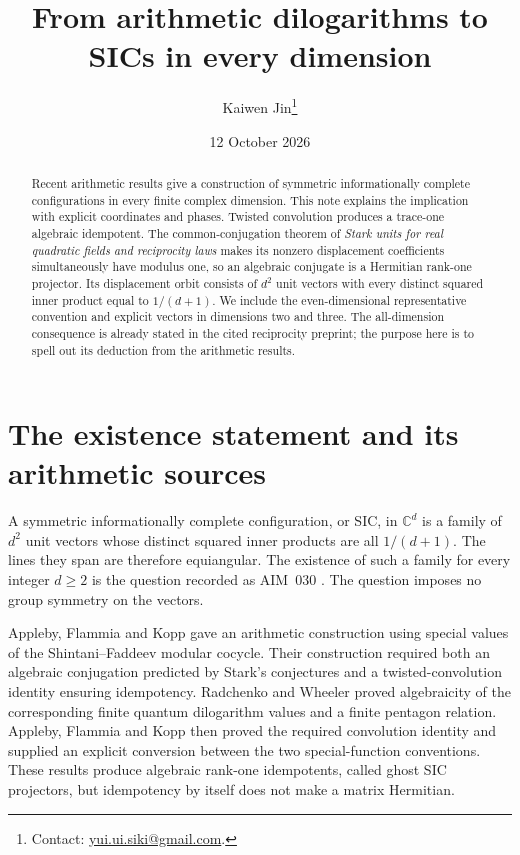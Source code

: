 \documentclass[11pt]{article}
\title{From arithmetic dilogarithms to SICs in every dimension}
\author{Kaiwen Jin\thanks{Contact: \href{mailto:yui.ui.siki@gmail.com}{yui.ui.siki@gmail.com}.}}
\date{12 October 2026}
\newcommand{\C}{\mathbb C}
\begin{document}
\maketitle
\begin{abstract}
Recent arithmetic results give a construction of symmetric informationally
complete configurations in every finite complex dimension. This note explains
the implication with explicit coordinates and phases. Twisted convolution
produces a trace-one algebraic idempotent. The common-conjugation theorem of
\emph{Stark units for real quadratic fields and reciprocity laws} makes its
nonzero displacement coefficients simultaneously have modulus one, so an
algebraic conjugate is a Hermitian rank-one projector. Its displacement orbit
consists of $d^2$ unit vectors with every distinct squared inner product equal
to $1/(d+1)$. We include the even-dimensional representative convention and
explicit vectors in dimensions two and three. The all-dimension consequence
is already stated in the cited reciprocity preprint; the purpose here is to
spell out its deduction from the arithmetic results.
\end{abstract}

\section{The existence statement and its arithmetic sources}
\label{sec:introduction}

A symmetric informationally complete configuration, or SIC, in $\C^d$ is a
family of $d^2$ unit vectors whose distinct squared inner products are all
$1/(d+1)$. The lines they span are therefore equiangular. The existence of such
a family for every integer $d\geq2$ is the question recorded as AIM~030
\cite{AIM030}. The question imposes no group symmetry on the vectors.

Appleby, Flammia and Kopp \cite{AFK25} gave an arithmetic construction using
special values of the Shintani--Faddeev modular cocycle. Their construction
required both an algebraic conjugation predicted by Stark's conjectures and a
twisted-convolution identity ensuring idempotency. Radchenko and Wheeler
\cite{RW26} proved algebraicity of the corresponding finite quantum
dilogarithm values and a finite pentagon relation. Appleby, Flammia and Kopp
\cite{AFK26} then proved the required convolution identity and supplied an
explicit conversion between the two special-function conventions.
These results produce algebraic rank-one idempotents, called ghost SIC
projectors, but idempotency by itself does not make a matrix Hermitian.
\end{document}
